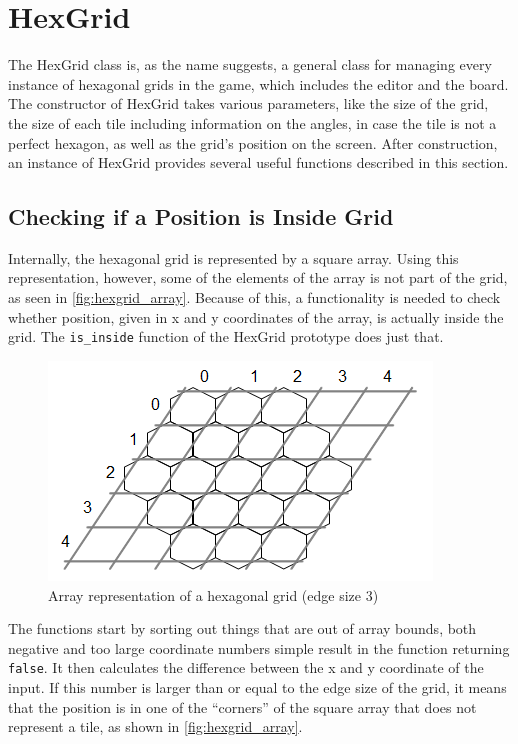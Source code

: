 \section{HexGrid}
\label{sec:hexgrid}

The HexGrid class is, as the name suggests, a general class for managing every instance of hexagonal grids in the game, which includes the editor and the board. The constructor of HexGrid takes various parameters, like the size of the grid, the size of each tile including information on the angles, in case the tile is not a perfect hexagon, as well as the grid's position on the screen. After construction, an instance of HexGrid provides several useful functions described in this section.

\subsection{Checking if a Position is Inside Grid}
Internally, the hexagonal grid is represented by a square array. Using this representation, however, some of the elements of the array is not part of the grid, as seen in \autoref{fig:hexgrid_array}. Because of this, a functionality is needed to check whether position, given in x and y coordinates of the array, is actually inside the grid. The \texttt{is\_inside} function of the HexGrid prototype does just that.

\begin{figure}[ht]
\includegraphics[scale=1]{img/hexgrid_array.png}
\caption{Array representation of a hexagonal grid (edge size 3)}
\label{fig:hexgrid_array}
\end{figure}

The functions start by sorting out things that are out of array bounds, both negative and too large coordinate numbers simple result in the function returning \texttt{false}. It then calculates the difference between the x and y coordinate of the input. If this number is larger than or equal to the edge size of the grid, it means that the position is in one of the ``corners'' of the square array that does not represent a tile, as shown in \autoref{fig:hexgrid_array}.

